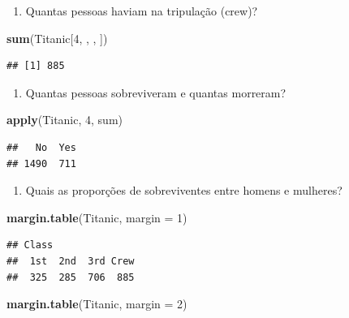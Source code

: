 \documentclass[
]{book}
\newenvironment{Shaded}{\begin{snugshade}}{\end{snugshade}}
\newcommand{\DataTypeTok}[1]{\textcolor[rgb]{0.13,0.29,0.53}{#1}}
\newcommand{\DecValTok}[1]{\textcolor[rgb]{0.00,0.00,0.81}{#1}}
\newcommand{\KeywordTok}[1]{\textcolor[rgb]{0.13,0.29,0.53}{\textbf{#1}}}
\newcommand{\NormalTok}[1]{#1}
\providecommand{\tightlist}{%
  \setlength{\itemsep}{0pt}\setlength{\parskip}{0pt}}
\begin{document}
\begin{enumerate}
\def\labelenumi{\arabic{enumi}.}
\setcounter{enumi}{1}
\tightlist
\item
  Quantas pessoas haviam na tripulação (crew)?
\end{enumerate}

\begin{Shaded}
\begin{Highlighting}[]
\KeywordTok{sum}\NormalTok{(Titanic[}\DecValTok{4}\NormalTok{, , , ])}
\end{Highlighting}
\end{Shaded}

\begin{verbatim}
## [1] 885
\end{verbatim}

\begin{enumerate}
\def\labelenumi{\arabic{enumi}.}
\setcounter{enumi}{2}
\tightlist
\item
  Quantas pessoas sobreviveram e quantas morreram?
\end{enumerate}

\begin{Shaded}
\begin{Highlighting}[]
\KeywordTok{apply}\NormalTok{(Titanic, }\DecValTok{4}\NormalTok{, sum)}
\end{Highlighting}
\end{Shaded}

\begin{verbatim}
##   No  Yes 
## 1490  711
\end{verbatim}

\begin{enumerate}
\def\labelenumi{\arabic{enumi}.}
\setcounter{enumi}{3}
\tightlist
\item
  Quais as proporções de sobreviventes entre homens e mulheres?
\end{enumerate}

\begin{Shaded}
\begin{Highlighting}[]
\KeywordTok{margin.table}\NormalTok{(Titanic, }\DataTypeTok{margin =} \DecValTok{1}\NormalTok{)}
\end{Highlighting}
\end{Shaded}

\begin{verbatim}
## Class
##  1st  2nd  3rd Crew 
##  325  285  706  885
\end{verbatim}

\begin{Shaded}
\begin{Highlighting}[]
\KeywordTok{margin.table}\NormalTok{(Titanic, }\DataTypeTok{margin =} \DecValTok{2}\NormalTok{)}
\end{Highlighting}
\end{Shaded}
\end{document}
